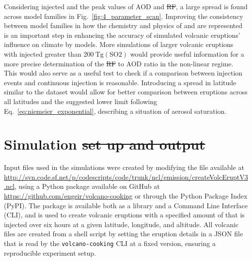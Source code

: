 \documentclass[draft]{agujournal2019}
\makeatletter
\providecommand{\DIFadd}[1]{{\protect\color{blue}\uwave{#1}}} %
\providecommand{\DIFdel}[1]{{\protect\color{red}\sout{#1}}} %
\providecommand{\DIFaddbegin}{} %
\providecommand{\DIFaddend}{} %
\providecommand{\DIFdelbegin}{} %
\providecommand{\DIFdelend}{} %
\let\sout@orig\sout %
\renewcommand{\sout}[1]{\ifmmode\text{\sout@orig{\ensuremath{#1}}}\else\sout@orig{#1}\fi} %
\makeatother
\begin{document}
  Considering injected  and the peak values of AOD and \DIFdelbegin \DIFdel{RF}\DIFdelend \DIFaddbegin \DIFadd{ERF}\DIFaddend , a large spread is
  found across model families in Fig.~\ref{fig:4_parameter_scan}. Improving the
  consistency between model families in how the chemistry and physics of  and
   are represented is an important step in enhancing the accuracy of simulated
  volcanic eruptions' influence on climate by models. More simulations of larger
  volcanic eruptions with injected  greater than
  \(\SI{200}{\tera\gram(\mathrm{SO2})}\) would provide useful information for a more
  precise determination of the \DIFdelbegin \DIFdel{RF }\DIFdelend \DIFaddbegin \DIFadd{ERF }\DIFaddend to AOD ratio in the non-linear regime. This would
  also serve as a useful test to check if a comparison between  injection events
  and continuous  injection is reasonable. Introducing a spread in latitude
  similar to the  dataset would allow for better comparison
  between eruptions across all latitudes and the suggested lower limit following
  Eq.~\ref{eq:niemeier_exponential}, describing a situation of aerosol saturation.

  \appendix

  \section{Simulation \DIFdelbegin \DIFdel{set up and output}\DIFdelend \DIFaddbegin \DIFadd{setup}\DIFaddend }

  Input files used in the simulations were created by modifying the file available at \url{http://svn.code.sf.net/p/codescripts/code/trunk/ncl/emission/createVolcEruptV3.ncl},
  using a Python package available on GitHub at
  \url{https://github.com/engeir/volcano-cooking} or through the Python Package Index
  (PyPI). The package is available both as a library and a Command Line Interface (CLI),
  and is used to create volcanic eruptions with a specified amount of  that is
  injected over six hours at a given latitude, longitude, and altitude. All volcanic
   files are created from a shell script by setting the eruption details in a
  JSON file that is read by the \texttt{volcano-cooking} CLI at a fixed version,
  ensuring a reproducible experiment setup.
\end{document}
